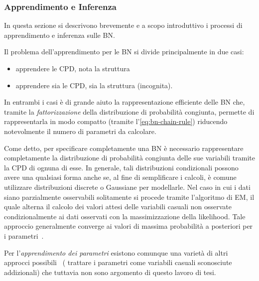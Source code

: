 \subsubsection{Apprendimento e Inferenza}
In questa sezione si descrivono brevemente e a scopo introduttivo i processi di apprendimento e inferenza sulle \acl{BN}.

Il problema dell'apprendimento per le \acl{BN} si divide principalmente in due casi:
\begin{itemize}
    \item apprendere le \acs{CPD}, nota la struttura
    \item apprendere sia le \acs{CPD}, sia la struttura (incognita).
\end{itemize}
In entrambi i casi è di grande aiuto la rappresentazione efficiente delle \acl{BN} che, tramite la \emph{fattorizzazione} della distribuzione di probabilità congiunta, permette di rappresentarla in modo compatto (tramite l'\autoref{eq:bn-chain-rule}) riducendo notevolmente il numero di parametri da calcolare.

Come detto, per specificare completamente una \acl{BN} è necessario rappresentare completamente la distribuzione di probabilità congiunta delle sue variabili tramite la \acl{CPD} di ognuna di esse. In generale, tali distribuzioni condizionali possono avere una qualsiasi forma anche se, al fine di semplificare i calcoli, è comune utilizzare distribuzioni discrete o Gaussiane per modellarle. Nel caso in cui i dati siano parzialmente osservabili solitamente si procede tramite l'algoritmo di \acf{EM}, il quale alterna il calcolo dei valori attesi delle variabili casuali non osservate condizionalmente ai dati osservati con la massimizzazione della likelihood. Tale approccio generalmente converge ai valori di massima probabilità a posteriori per i parametri~\citep[si veda][]{Dempster1977}.

Per l'\emph{apprendimento dei parametri} esistono comunque una varietà di altri approcci possibili~\citep[si veda][]{Heckerman1996} (\eg{} trattare i parametri come variabili casuali sconosciute addizionali) che tuttavia non sono argomento di questo lavoro di tesi.


